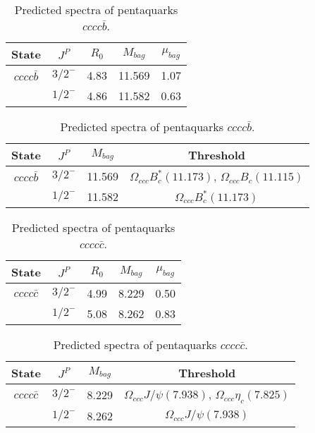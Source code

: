 \documentclass[prd,twocolumn,floatfix,nofootinbib]{revtex4}
\begin{document}
\renewcommand{\tabcolsep}{0.5cm}
\renewcommand{\arraystretch}{1.2}
\begin{table*}[!htbp]
    \caption{Predicted spectra of pentaquarks $cccc\bar{b}$.}
    \begin{tabular}{ccccc}
        \hline\hline
        {\rm State} &$J^{P}$ &$R_{0}$ &$M_{bag}$ &$\mu_{bag}$ \\ \hline
        ${cccc\bar{b}}$
        &${3/2}^{-}$    &4.83   &11.569 &1.07 \\ 
        &${1/2}^{-}$    &4.86   &11.582 &0.63 \\ 
        \hline\hline
    \end{tabular}
\end{table*}

\renewcommand{\tabcolsep}{0.5cm}
\renewcommand{\arraystretch}{1.2}
\begin{table*}[!htbp]
    \caption{Predicted spectra of pentaquarks $cccc\bar{b}$.}
    \begin{tabular}{cccc}
        \hline\hline
        {\rm State} &$J^{P}$ &$M_{bag}$ &Threshold \\ \hline
        ${cccc\bar{b}}$
        &${3/2}^{-}$    &11.569 &$\Omega_{ccc} B^{\ast}_{c}(11.173)$, $\Omega_{ccc} B_{c}(11.115)$ \\ 
        &${1/2}^{-}$    &11.582 &$\Omega_{ccc} B^{\ast}_{c}(11.173)$ \\ 
        \hline\hline
    \end{tabular}
\end{table*}

\renewcommand{\tabcolsep}{0.5cm}
\renewcommand{\arraystretch}{1.2}
\begin{table*}[!htbp]
    \caption{Predicted spectra of pentaquarks $cccc\bar{c}$.}
    \begin{tabular}{ccccc}
        \hline\hline
        {\rm State} &$J^{P}$ &$R_{0}$ &$M_{bag}$ &$\mu_{bag}$ \\ \hline
        ${cccc\bar{c}}$
        &${3/2}^{-}$    &4.99   &8.229  &0.50 \\
        &${1/2}^{-}$    &5.08   &8.262  &0.83 \\
        \hline\hline
    \end{tabular}
\end{table*}

\renewcommand{\tabcolsep}{0.5cm}
\renewcommand{\arraystretch}{1.2}
\begin{table*}[!htbp]
    \caption{Predicted spectra of pentaquarks $cccc\bar{c}$.}
    \begin{tabular}{cccc}
        \hline\hline
        {\rm State} &$J^{P}$ &$M_{bag}$ &Threshold \\ \hline
        ${cccc\bar{c}}$
        &${3/2}^{-}$    &8.229  &$\Omega_{ccc} J/\psi(7.938)$, $\Omega_{ccc} \eta_{c}(7.825)$ \\
        &${1/2}^{-}$    &8.262  &$\Omega_{ccc} J/\psi(7.938)$ \\
        \hline\hline
    \end{tabular}
\end{table*}
\end{document}
